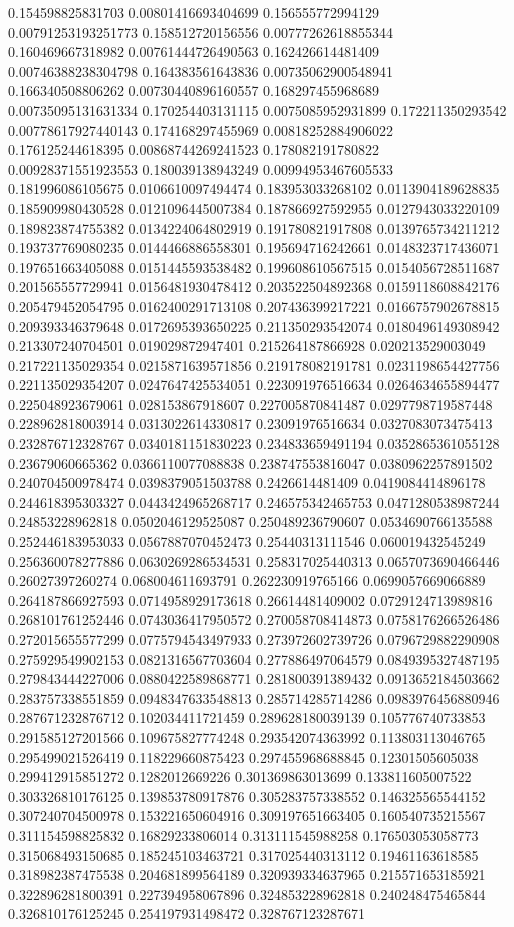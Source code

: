 \begin{table}
\begin{tabu}
\begin{sparkline}{10}
0.154598825831703 0.00801416693404699 0.156555772994129 0.00791253193251773 0.158512720156556 0.00777262618855344 0.160469667318982 0.00761444726490563 0.162426614481409 0.00746388238304798 0.164383561643836 0.00735062900548941 0.166340508806262 0.00730440896160557 0.168297455968689 0.00735095131631334 0.170254403131115 0.0075085952931899 0.172211350293542 0.00778617927440143 0.174168297455969 0.00818252884906022 0.176125244618395 0.00868744269241523 0.178082191780822 0.00928371551923553 0.180039138943249 0.00994953467605533 0.181996086105675 0.0106610097494474 0.183953033268102 0.0113904189628835 0.185909980430528 0.0121096445007384 0.187866927592955 0.0127943033220109 0.189823874755382 0.0134224064802919 0.191780821917808 0.0139765734211212 0.193737769080235 0.0144466886558301 0.195694716242661 0.0148323717436071 0.197651663405088 0.0151445593538482 0.199608610567515 0.0154056728511687 0.201565557729941 0.0156481930478412 0.203522504892368 0.0159118608842176 0.205479452054795 0.0162400291713108 0.207436399217221 0.0166757902678815 0.209393346379648 0.0172695393650225 0.211350293542074 0.0180496149308942 0.213307240704501 0.019029872947401 0.215264187866928 0.020213529003049 0.217221135029354 0.0215871639571856 0.219178082191781 0.0231198654427756 0.221135029354207 0.0247647425534051 0.223091976516634 0.0264634655894477 0.225048923679061 0.028153867918607 0.227005870841487 0.0297798719587448 0.228962818003914 0.0313022614330817 0.23091976516634 0.0327083073475413 0.232876712328767 0.0340181151830223 0.234833659491194 0.0352865361055128 0.23679060665362 0.0366110077088838 0.238747553816047 0.0380962257891502 0.240704500978474 0.0398379051503788 0.2426614481409 0.0419084414896178 0.244618395303327 0.0443424965268717 0.246575342465753 0.0471280538987244 0.24853228962818 0.0502046129525087 0.250489236790607 0.0534690766135588 0.252446183953033 0.0567887070452473 0.25440313111546 0.060019432545249 0.256360078277886 0.0630269286534531 0.258317025440313 0.0657073690466446 0.26027397260274 0.068004611693791 0.262230919765166 0.0699057669066889 0.264187866927593 0.0714958929173618 0.26614481409002 0.0729124713989816 0.268101761252446 0.0743036417950572 0.270058708414873 0.0758176266526486 0.272015655577299 0.0775794543497933 0.273972602739726 0.0796729882290908 0.275929549902153 0.0821316567703604 0.277886497064579 0.0849395327487195 0.279843444227006 0.0880422589868771 0.281800391389432 0.0913652184503662 0.283757338551859 0.0948347633548813 0.285714285714286 0.0983976456880946 0.287671232876712 0.102034411721459 0.289628180039139 0.105776740733853 0.291585127201566 0.109675827774248 0.293542074363992 0.113803113046765 0.295499021526419 0.118229660875423 0.297455968688845 0.12301505605038 0.299412915851272 0.1282012669226 0.301369863013699 0.133811605007522 0.303326810176125 0.139853780917876 0.305283757338552 0.146325565544152 0.307240704500978 0.153221650604916 0.309197651663405 0.160540735215567 0.311154598825832 0.16829233806014 0.313111545988258 0.176503053058773 0.315068493150685 0.185245103463721 0.317025440313112 0.19461163618585 0.318982387475538 0.204681899564189 0.320939334637965 0.215571653185921 0.322896281800391 0.227394958067896 0.324853228962818 0.240248475465844 0.326810176125245 0.254197931498472 0.328767123287671 
\end{sparkline}
\end{tabu}
\end{table}
